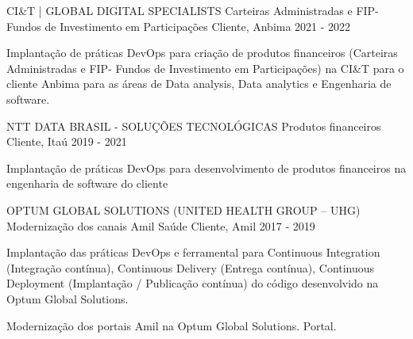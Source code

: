 

\begin{cventries}

  \cventry
    {CI\&T | GLOBAL DIGITAL SPECIALISTS} %
    {Carteiras Administradas e FIP- Fundos de Investimento em Participações} %
    {Cliente, Anbima} %
    {2021 - 2022} %
    {
      \begin{cvitems} %
        \item {Implantação de práticas DevOps para criação de produtos financeiros (Carteiras Administradas e FIP- Fundos de Investimento em Participações) na CI&T para o cliente Anbima para as áreas de Data analysis, Data analytics e Engenharia de software.}
      \end{cvitems}
    }

  \cventry
    {NTT DATA BRASIL - SOLUÇÕES TECNOLÓGICAS} %
    {Produtos financeiros} %
    {Cliente, Itaú} %
    {2019 - 2021} %
    {
      \begin{cvitems} %
        \item {Implantação de práticas DevOps para desenvolvimento de produtos financeiros na engenharia de software do cliente}
      \end{cvitems}
    }

  \cventry
    {OPTUM GLOBAL SOLUTIONS (UNITED HEALTH GROUP – UHG)} %
    {Modernização dos canais Amil Saúde} %
    {Cliente, Amil} %
    {2017 - 2019} %
    {
      \begin{cvitems} %
        \item {Implantação das práticas DevOps e ferramental para Continuous Integration (Integração contínua), Continuous Delivery (Entrega contínua), Continuous Deployment (Implantação / Publicação contínua) do código desenvolvido na Optum Global Solutions.}
        \item {Modernização dos portais Amil na Optum Global Solutions. Portal.}
      \end{cvitems}
}

\end{cventries}

